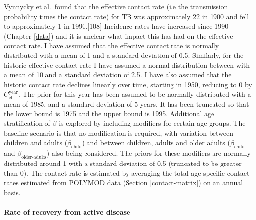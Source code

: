\documentclass[11pt,twoside]{bristolthesis}
\begin{document}
  Vynnycky et al.~found that the effective contact rate (i.e the transmission probability times the contact rate) for TB was approximately 22 in 1900 and fell to approximately 1 in 1990.{[}108{]} Incidence rates have increased since 1990 (Chapter \ref{data}) and it is unclear what impact this has had on the effective contact rate. I have assumed that the effective contact rate is normally distributed with a mean of 1 and a standard deviation of 0.5. Similarly, for the historic effective contact rate I have assumed a normal distribution between with a mean of 10 and a standard deviation of 2.5. I have also assumed that the historic contact rate declines linearly over time, starting in 1950, reducing to 0 by \(C^{\text{year}}_{\text{eff}}\). The prior for this year has been assumed to be normally distributed with a mean of 1985, and a standard deviation of 5 years. It has been truncated so that the lower bound is 1975 and the upper bound is 1995. Additional age stratification of \(\beta\) is explored by including modifiers for certain age-groups. The baseline scenario is that no modification is required, with variation between children and adults (\(\beta_{\text{child}}\)) and between children, adults and older adults (\(\beta_{\text{child}}\) and \(\beta_{\text{older-adults}}\)) also being considered. The priors for these modifiers are normally distributed around 1 with a standard deviation of 0.5 (truncated to be greater than 0). The contact rate is estimated by averaging the total age-specific contact rates estimated from POLYMOD data (Section \ref{contact-matrix}) on an annual basis.
  
  \hypertarget{rate-of-recovery-from-active-disease}{%
  \paragraph{Rate of recovery from active disease}\label{rate-of-recovery-from-active-disease}}
  
\end{document}
